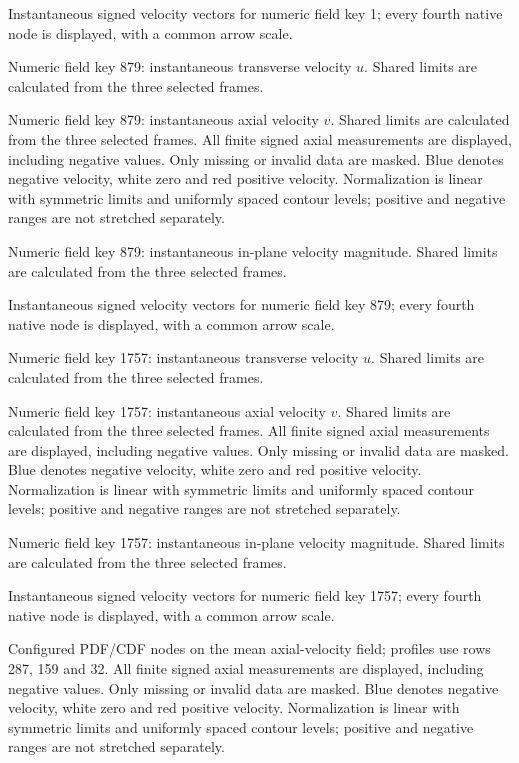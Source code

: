\caption{Instantaneous signed velocity vectors for numeric field key 1; every fourth native node is displayed, with a common arrow scale.}

\caption{Numeric field key 879: instantaneous transverse velocity $u$. Shared limits are calculated from the three selected frames.}

\caption{Numeric field key 879: instantaneous axial velocity $v$. Shared limits are calculated from the three selected frames. All finite signed axial measurements are displayed, including negative values. Only missing or invalid data are masked. Blue denotes negative velocity, white zero and red positive velocity. Normalization is linear with symmetric limits and uniformly spaced contour levels; positive and negative ranges are not stretched separately.}

\caption{Numeric field key 879: instantaneous in-plane velocity magnitude. Shared limits are calculated from the three selected frames.}

\caption{Instantaneous signed velocity vectors for numeric field key 879; every fourth native node is displayed, with a common arrow scale.}

\caption{Numeric field key 1757: instantaneous transverse velocity $u$. Shared limits are calculated from the three selected frames.}

\caption{Numeric field key 1757: instantaneous axial velocity $v$. Shared limits are calculated from the three selected frames. All finite signed axial measurements are displayed, including negative values. Only missing or invalid data are masked. Blue denotes negative velocity, white zero and red positive velocity. Normalization is linear with symmetric limits and uniformly spaced contour levels; positive and negative ranges are not stretched separately.}

\caption{Numeric field key 1757: instantaneous in-plane velocity magnitude. Shared limits are calculated from the three selected frames.}

\caption{Instantaneous signed velocity vectors for numeric field key 1757; every fourth native node is displayed, with a common arrow scale.}

\caption{Configured PDF/CDF nodes on the mean axial-velocity field; profiles use rows 287, 159 and 32. All finite signed axial measurements are displayed, including negative values. Only missing or invalid data are masked. Blue denotes negative velocity, white zero and red positive velocity. Normalization is linear with symmetric limits and uniformly spaced contour levels; positive and negative ranges are not stretched separately.}


